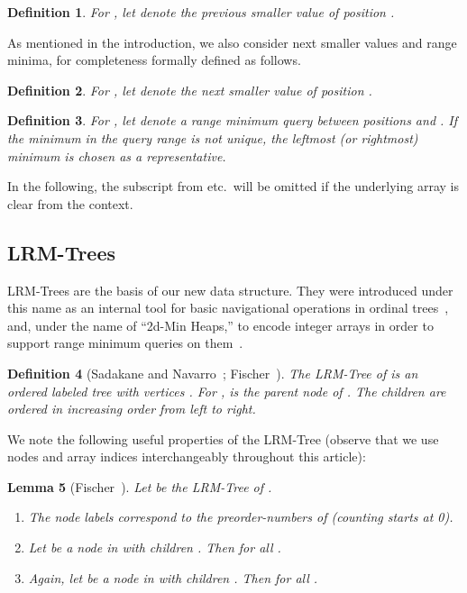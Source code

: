 \documentclass[11pt,onecolumn,final]{article} \usepackage{a4}
\theoremstyle{plain}
\newtheorem{definition}{Definition}
\newtheorem{lemma}[definition]{Lemma}
\theoremstyle{remark}
\begin{document}
\begin{definition}
  \label{def:psv}
  For , let  denote the \emph{previous smaller value} of position .
\end{definition}

As mentioned in the introduction, we also consider next smaller values and range minima, for completeness formally defined as follows.

\begin{definition}
  \label{def:nsv}
  For , let  denote the \emph{next smaller value} of position .
\end{definition}

\begin{definition}
  \label{def:rmq}
  For , let  denote a \emph{range minimum query} between positions  and . If the minimum in the query range is not unique, the leftmost (or rightmost) minimum is chosen as a representative.
\end{definition}

In the following, the subscript  from  etc.\ will be omitted if the underlying array  is clear from the context.

\subsection{LRM-Trees }
\label{sect:lrm}

LRM-Trees are the basis of our new data structure. They were introduced under this name as an internal tool for basic navigational operations in ordinal trees~\cite{sadakane10fully}, and, under the name of ``2d-Min Heaps,'' to encode integer arrays in order to support range minimum queries on them~\cite{fischer10optimal}.
 
\begin{definition}[Sadakane and Navarro~\cite{sadakane10fully}; Fischer~\cite{fischer10optimal}]
  \label{def:2dmin}
  The \emph{LRM-Tree} of  is an ordered labeled tree with vertices . For ,  is the parent node of . The children are ordered in increasing order from left to right.
\end{definition}

We note the following useful properties of the LRM-Tree (observe that we use nodes and array indices interchangeably throughout this article):

\begin{lemma}[Fischer~\cite{fischer10optimal}]
  \label{lemma:basic}
  Let  be the LRM-Tree of .
  \begin{enumerate}
  \item The node labels correspond to the preorder-numbers of  (counting starts at 0).
  \item Let  be a node in  with children . Then  for all .
  \item Again, let  be a node in  with children . Then  for all .
  \end{enumerate}
\end{lemma}
\end{document}
